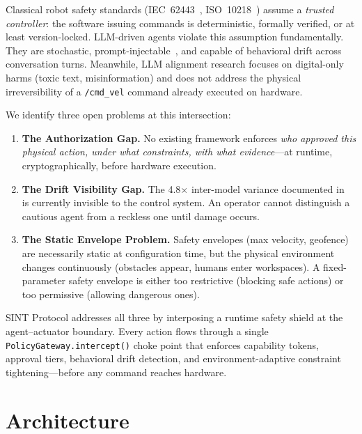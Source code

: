 \documentclass[conference]{IEEEtran}
\begin{document}
Classical robot safety standards (IEC~62443~\cite{iec62443}, ISO~10218~\cite{iso10218})
assume a \emph{trusted controller}: the software issuing commands is deterministic,
formally verified, or at least version-locked.
LLM-driven agents violate this assumption fundamentally.
They are stochastic, prompt-injectable~\cite{owasp-asi}, and capable of behavioral
drift across conversation turns.
Meanwhile, LLM alignment research focuses on digital-only harms (toxic text,
misinformation) and does not address the physical irreversibility of a
\texttt{/cmd\_vel} command already executed on hardware.

We identify three open problems at this intersection:

\begin{enumerate}
  \item \textbf{The Authorization Gap.}
  No existing framework enforces \emph{who approved this physical action, under
  what constraints, with what evidence}---at runtime, cryptographically, before
  hardware execution.

  \item \textbf{The Drift Visibility Gap.}
  The 4.8$\times$ inter-model variance documented in~\cite{rosclaw} is currently
  invisible to the control system.
  An operator cannot distinguish a cautious agent from a reckless one until
  damage occurs.

  \item \textbf{The Static Envelope Problem.}
  Safety envelopes (max velocity, geofence) are necessarily static at
  configuration time, but the physical environment changes continuously
  (obstacles appear, humans enter workspaces).
  A fixed-parameter safety envelope is either too restrictive (blocking safe
  actions) or too permissive (allowing dangerous ones).
\end{enumerate}

SINT Protocol addresses all three by interposing a runtime safety shield at the
agent--actuator boundary.
Every action flows through a single \texttt{PolicyGateway.intercept()} choke point
that enforces capability tokens, approval tiers, behavioral drift detection, and
environment-adaptive constraint tightening---before any command reaches hardware.

\section{Architecture}
\label{sec:arch}
\end{document}
